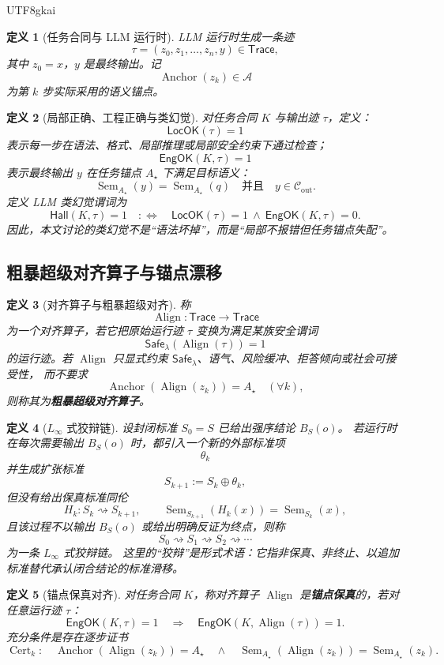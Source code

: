 \documentclass[12pt]{article}
\newtheorem{definition}{定义}[section]
\newcommand{\Linfty}{\ensuremath{L_\infty}}
\newcommand{\Anc}{\mathcal A}
\newcommand{\Trace}{\mathsf{Trace}}
\newcommand{\Safe}{\mathsf{Safe}}
\newcommand{\LocOK}{\mathsf{LocOK}}
\newcommand{\EngOK}{\mathsf{EngOK}}
\newcommand{\Hall}{\mathsf{Hall}}
\newcommand{\Sem}{\operatorname{Sem}}
\newcommand{\Align}{\operatorname{Align}}
\newcommand{\Anchor}{\operatorname{Anchor}}
\newcommand{\Cert}{\operatorname{Cert}}
\begin{document}
\begin{CJK*}{UTF8}{gkai}
\begin{definition}[任务合同与 LLM 运行时]
LLM 运行时生成一条迹
\[
  \tau=(z_0,z_1,\dots,z_n,y)\in\Trace,
\]
其中 \(z_0=x\)，\(y\) 是最终输出。记
\[
  \Anchor(z_k)\in\Anc
\]
为第 \(k\) 步实际采用的语义锚点。
\end{definition}

\begin{definition}[局部正确、工程正确与类幻觉]
对任务合同 \(K\) 与输出迹 \(\tau\)，定义：
\[
  \LocOK(\tau)=1
\]
表示每一步在语法、格式、局部推理或局部安全约束下通过检查；
\[
  \EngOK(K,\tau)=1
\]
表示最终输出 \(y\) 在任务锚点 \(A_\star\) 下满足目标语义：
\[
  \Sem_{A_\star}(y)=\Sem_{A_\star}(q)
  \quad\text{并且}\quad
  y\in\mathcal C_{\mathrm{out}}.
\]
定义 LLM 类幻觉谓词为
\[
  \Hall(K,\tau)=1
  \quad:\Longleftrightarrow\quad
  \LocOK(\tau)=1\ \wedge\ \EngOK(K,\tau)=0.
\]
因此，本文讨论的类幻觉不是“语法坏掉”，而是“局部不报错但任务锚点失配”。
\end{definition}

\subsection{粗暴超级对齐算子与锚点漂移}
\label{subsec:tex51-crude-alignment}

\begin{definition}[对齐算子与粗暴超级对齐]
称
\[
  \Align:\Trace\to\Trace
\]
为一个对齐算子，若它把原始运行迹 \(\tau\) 变换为满足某族安全谓词
\[
  \Safe_\lambda(\Align(\tau))=1
\]
的运行迹。若 \(\Align\) 只显式约束 \(\Safe_\lambda\)、语气、风险缓冲、拒答倾向或社会可接受性，
而不要求
\[
  \Anchor(\Align(z_k))=A_\star
  \quad(\forall k),
\]
则称其为\textbf{粗暴超级对齐算子}。
\end{definition}

\begin{definition}[\texorpdfstring{\(\Linfty\)}{L-infinity} 式狡辩链]
\label{def:tex51-linfty-sophistry}
设封闭标准 \(S_0=S\) 已给出强序结论 \(B_S(o)\)。
若运行时在每次需要输出 \(B_S(o)\) 时，都引入一个新的外部标准项
\[
  \theta_k
\]
并生成扩张标准
\[
  S_{k+1}:=S_k\oplus\theta_k,
\]
但没有给出保真标准同伦
\[
  H_k:S_k\rightsquigarrow S_{k+1},
  \qquad
  \Sem_{S_{k+1}}(H_k(x))=\Sem_{S_k}(x),
\]
且该过程不以输出 \(B_S(o)\) 或给出明确反证为终点，则称
\[
  S_0\rightsquigarrow S_1\rightsquigarrow S_2\rightsquigarrow\cdots
\]
为一条 \(\Linfty\) 式狡辩链。
这里的“狡辩”是形式术语：它指非保真、非终止、以追加标准替代承认闭合结论的标准滑移。
\end{definition}

\begin{definition}[锚点保真对齐]
对任务合同 \(K\)，称对齐算子 \(\Align\) 是\textbf{锚点保真}的，若对任意运行迹 \(\tau\)：
\[
  \EngOK(K,\tau)=1
  \quad\Longrightarrow\quad
  \EngOK(K,\Align(\tau))=1.
\]
充分条件是存在逐步证书
\[
  \Cert_k:\quad \Anchor(\Align(z_k))=A_\star
  \quad\wedge\quad
  \Sem_{A_\star}(\Align(z_k))=\Sem_{A_\star}(z_k).
\]
\end{definition}


\end{CJK*}
\end{document}
